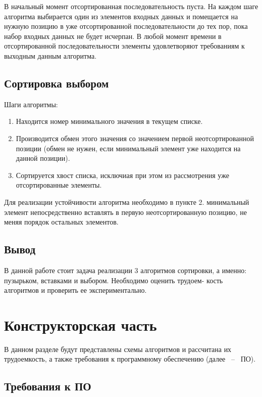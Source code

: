\documentclass[14pt,russian]{scrartcl}
\begin{document}
В начальный момент отсортированная последовательность пуста. На каждом шаге алгоритма выбирается один из элементов входных данных и помещается на нужную позицию в уже отсортированной последовательности до тех пор, пока набор входных данных не будет исчерпан. В любой момент времени в отсортированной последовательности элементы удовлетворяют требованиям к выходным данным алгоритма.

\subsection{Сортировка выбором}

Шаги алгоритмы:

\begin{enumerate}
    \item Находится номер минимального значения в текущем списке.
    \item Производится обмен этого значения со значением первой неотсортированной позиции (обмен не нужен, если минимальный элемент уже находится на данной позиции).
    \item Сортируется хвост списка, исключиая при этом из рассмотрения уже отсортированные элементы.
\end{enumerate}

Для реализации устойчивости алгоритма необходимо в пункте 2. минимальный элемент непосредственно вставлять в первую неотсортированную позицию, не меняя порядок остальных элементов.

\subsection*{Вывод}

В данной работе стоит задача реализации 3 алгоритмов сортировки, а именно: пузырьком, вставками и выбором. Необходимо оценить трудоем- кость алгоритмов и проверить ее экспериментально.

\section{Конструкторская часть}

В данном разделе будут представлены схемы алгоритмов и рассчитана их трудоемкость, а также требования к программному обеспечению (далее ~--~ ПО).

\subsection{Требования к ПО}
\end{document}

